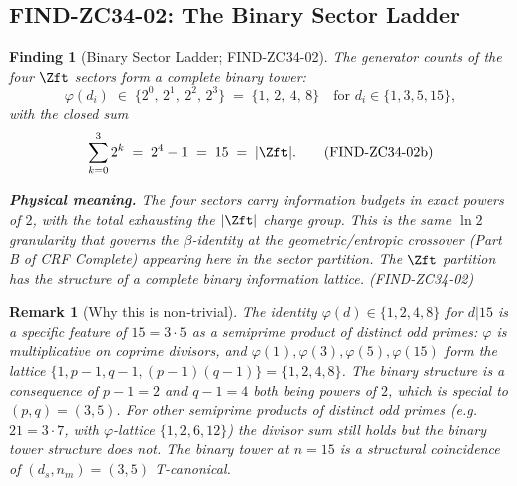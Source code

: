 \documentclass[12pt, a4paper]{article}
\newtheorem{remark}{Remark}[section]
\newtheorem{finding}{Finding}[section]
\begin{document}
\subsection{FIND-ZC34-02: The Binary Sector Ladder}
\label{sec:find-02}

\begin{finding}[Binary Sector Ladder; FIND-ZC34-02]
\label{find:zc34-02}
The generator counts of the four $\Zft$ sectors form a complete
binary tower:
\begin{equation}
  \varphi(d_i) \;\in\; \{2^0,\,2^1,\,2^2,\,2^3\}
    \;=\; \{1,\,2,\,4,\,8\}
    \quad\text{for }d_i \in \{1, 3, 5, 15\},
  \tag{FIND-ZC34-02a}\label{eq:binary-tower}
\end{equation}
with the closed sum
\begin{equation}
  \sum_{k=0}^{3} 2^k \;=\; 2^4 - 1 \;=\; 15 \;=\; |\Zft|.
  \tag{FIND-ZC34-02b}\label{eq:tower-sum}
\end{equation}

\medskip
\textbf{Physical meaning.} The four sectors carry information
budgets in exact powers of $2$, with the total exhausting the
$|\Zft|$ charge group. This is the same $\ln 2$ granularity
that governs the $\beta$-identity at the geometric/entropic
crossover (Part B of CRF Complete) appearing here in the
sector partition. The $\Zft$ partition has the structure of a
\emph{complete binary information lattice}.
\hfill\textup{(FIND-ZC34-02)}
\end{finding}

\begin{remark}[Why this is non-trivial]
The identity $\varphi(d) \in \{1, 2, 4, 8\}$ for $d | 15$ is a
specific feature of $15 = 3 \cdot 5$ as a semiprime product of
distinct odd primes: $\varphi$ is multiplicative on coprime
divisors, and $\varphi(1), \varphi(3), \varphi(5), \varphi(15)$
form the lattice $\{1, p-1, q-1, (p-1)(q-1)\} = \{1, 2, 4, 8\}$.
The binary structure is a consequence of $p - 1 = 2$ and
$q - 1 = 4$ both being powers of $2$, which is special to
$(p, q) = (3, 5)$. For other semiprime products of distinct
odd primes (e.g.\ $21 = 3 \cdot 7$, with $\varphi$-lattice
$\{1, 2, 6, 12\}$) the divisor sum still holds but the binary
tower structure does not. The binary tower at $n = 15$ is a
structural coincidence of $(d_s, n_m) = (3, 5)$ T-canonical.
\end{remark}

\end{document}
